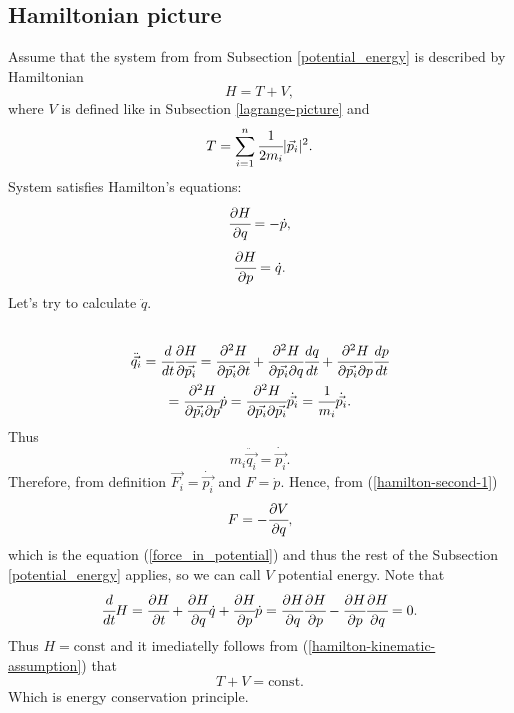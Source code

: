 \documentclass[main.tex]{subfiles}
\begin{document}
\subsection{Hamiltonian picture}
Assume that the system from from Subsection \ref{potential_energy} is described by Hamiltonian
\begin{equation}
\label{hamilton-kinematic-assumption}
H = T + V,
\end{equation}
where $V$ is defined like in Subsection \ref{lagrange-picture} and
\begin{equation}
T = \sum_{i=1}^n \cfrac{1}{2m_i}|\vec{p}_i|^2.
\end{equation}
System satisfies Hamilton's equations:
\begin{equation}
\cfrac{\partial H}{\partial q} = -\dot{p},
\end{equation}
\begin{equation}
\label{hamilton-second-1}
\cfrac{\partial H}{\partial p} = \dot{q}.
\end{equation}
Let's try to calculate $\ddot{q}$.
\begin{multline}
\\
\ddot{\vec{q_i}} = \cfrac{d}{dt}\cfrac{\partial H}{\partial \vec{p_i}} = \cfrac{\partial^2 H}{\partial \vec{p_i}\partial t}+ \cfrac{\partial^2 H}{\partial \vec{p_i}\partial q}\cfrac{dq}{dt}+\cfrac{\partial^2 H}{\partial \vec{p_i}\partial p}\cfrac{dp}{dt}\\
= \cfrac{\partial^2 H}{\partial \vec{p_i}\partial p}\dot{p} = \cfrac{\partial^2 H}{\partial \vec{p_i}\partial \vec{p_i}}\dot{\vec{p_i}} = \cfrac{1}{m_i} \dot{\vec{p_i}}.
\end{multline}
Thus
\begin{equation}
m_i \ddot{\vec{q_i}} = \dot{\vec{p_i}}.
\end{equation}
Therefore, from definition
$\vec{F_i} = \dot{\vec{p_i}}$ and $F = \dot{p}$.
Hence, from (\ref{hamilton-second-1})
\begin{equation}
F = -\cfrac{\partial V}{\partial q},
\end{equation}
which is the equation (\ref{force_in_potential}) and thus the rest of the Subsection \ref{potential_energy} applies, so we can call $V$ potential energy.
Note that
\begin{equation}
\cfrac{d}{dt} H = \cfrac{\partial H}{\partial t} + \cfrac{\partial H}{\partial q}\dot{q} + \cfrac{\partial H}{\partial p}\dot{p} = \cfrac{\partial H}{\partial q}\cfrac{\partial H}{\partial p} - \cfrac{\partial H}{\partial p}\cfrac{\partial H}{\partial q} = 0.
\end{equation}
Thus $H = \text{const}$ and it imediatelly follows from (\ref{hamilton-kinematic-assumption}) that
\begin{equation}
T + V = \text{const}.
\end{equation}
Which is energy conservation principle.
\end{document}
